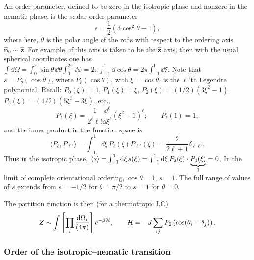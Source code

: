An order parameter, defined to be zero in the isotropic phase and nonzero in the nematic phase, is the scalar order
parameter
\begin{equation}
  s = \frac{1}{2}(3\cos^2\theta-1),
\end{equation}
where here, $\theta$ is the polar angle of the rods with respect to the ordering axis $\hat{\mathbf n}_0\sim\hat{\mathbf z}$.
For example, if this axis is taken to be the $\hat{\mathbf z}$ axis, then with the usual spherical coordinates one has
$\int\dd\Omega = \int_0^\pi\sin\theta\,\dd\theta\int_0^{2\pi}\dd\phi = 2\pi\int_{-1}^1\dd\cos\theta = 2\pi\int_{-1}^1\dd\xi$.
Note that $s = P_2(\cos\theta)$, where $P_\ell(\cos\theta)$, with $\xi = \cos\theta$, is the $\ell$'th Legendre polynomial.
Recall: $P_0(\xi) = 1$, $P_1(\xi) = \xi$, $P_2(\xi) = (1/2)(3\xi^2-1)$, $P_3(\xi) = (1/2)(5\xi^3-3\xi)$, etc.,
\begin{equation}
  P_\ell(\xi) = \frac{1}{2^\ell\ell!}\frac{\dd^\ell}{\dd\xi^\ell}(\xi^2-1)^\ell;\qquad P_\ell(1) = 1,
\end{equation}
and the inner product in the function space is
\begin{equation}
  \langle P_\ell,P_{\ell'}\rangle = \int_{-1}^1\dd\xi\,P_\ell(\xi)P_{\ell'}(\xi) = \frac{2}{2\ell+1}\delta_{\ell\ell'} .
\end{equation}
Thus in the isotropic phase,
$\langle s\rangle = \int_{-1}^1\mathop{}\!\mathrm{d}\xi\,s(\xi) = \int_{-1}^1\mathop{}\!\mathrm{d}\xi\,P_2(\xi)\cdot\underbrace{P_0(\xi)}_{1} = 0$. In the limit of
complete orientational ordering, $\cos\theta = 1$, $s = 1$. The full range of values of $s$ extends from $s = -1/2$
for $\theta = \pi/2$ to $s = 1$ for $\theta = 0$.

The partition function is then (for a thermotropic LC)
\begin{equation}
  Z\sim\int\left[\prod_i\frac{\mathop{}\!\mathrm{d}\Omega_i}{(4\pi)}\right]e^{-\beta\mathcal{H}},\qquad
  \mathcal{H} = -J\sum_{ij}P_2\left(\cos(\theta_i-\theta_j)\right).
\end{equation}

\subsubsection*{Order of the isotropic--nematic transition}

